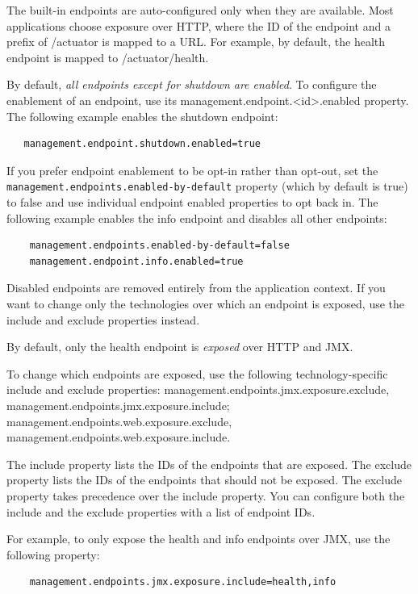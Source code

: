 \documentclass{scrartcl}
\begin{document}
The built-in endpoints are auto-configured only when they are available. Most applications choose exposure over HTTP, where the ID of the endpoint and a prefix of /actuator is mapped to a URL. For example, by default, the health endpoint is mapped to /actuator/health.

By default, \textit{all endpoints except for shutdown are enabled}. To configure the enablement of an endpoint, use its management.endpoint.\textless id\textgreater.enabled property. The following example enables the shutdown endpoint:

\begin{lstlisting}
   management.endpoint.shutdown.enabled=true
\end{lstlisting}

If you prefer endpoint enablement to be opt-in rather than opt-out, set the \lstinline|management.endpoints.enabled-by-default| property (which by default is true) to false and use individual endpoint enabled properties to opt back in. The following example enables the info endpoint and disables all other endpoints:

\begin{lstlisting}
    management.endpoints.enabled-by-default=false
    management.endpoint.info.enabled=true
\end{lstlisting}

Disabled endpoints are removed entirely from the application context. If you want to change only the technologies over which an endpoint is exposed, use the include and exclude properties instead.

By default, only the health endpoint is \textit{exposed} over HTTP and JMX.

To change which endpoints are exposed, use the following technology-specific include and exclude properties: management.endpoints.jmx.exposure.exclude,
management.endpoints.jmx.exposure.include; management.endpoints.web.exposure.exclude, management.endpoints.web.exposure.include.

The include property lists the IDs of the endpoints that are exposed. The exclude property lists the IDs of the endpoints that should not be exposed. The exclude property takes precedence over the include property. You can configure both the include and the exclude properties with a list of endpoint IDs.

For example, to only expose the health and info endpoints over JMX, use the following property:

\begin{lstlisting}
    management.endpoints.jmx.exposure.include=health,info
\end{lstlisting}
\end{document}
